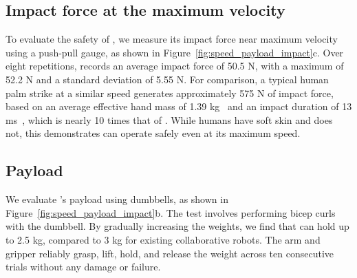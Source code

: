 \subsection{Impact force at the maximum velocity}
To evaluate the safety of \robot, we measure its impact force near maximum velocity using a push-pull gauge, as shown in Figure~\ref{fig:speed_payload_impact}c. Over eight repetitions, \robot records an average impact force of 50.5 N, with a maximum of 52.2 N and a standard deviation of 5.55 N. For comparison, a typical human palm strike at a similar speed generates approximately 575 N of impact force, based on an average effective hand mass of 1.39 kg~\cite{adamec2021biomechanical} and an impact duration of 13 ms~\cite{walilko2005biomechanics}, which is nearly 10 times that of \robot. While humans have soft skin and \robot does not, this demonstrates \robot can operate safely even at its maximum speed.



\subsection{Payload}

We evaluate \robot's payload using dumbbells, as shown in Figure~\ref{fig:speed_payload_impact}b. The test involves performing bicep curls with the dumbbell.
By gradually increasing the weights, we find that \robot can hold up to 2.5 kg, compared to 3 kg for existing collaborative robots. The arm and gripper reliably grasp, lift, hold, and release the weight across ten consecutive trials without any damage or failure.


